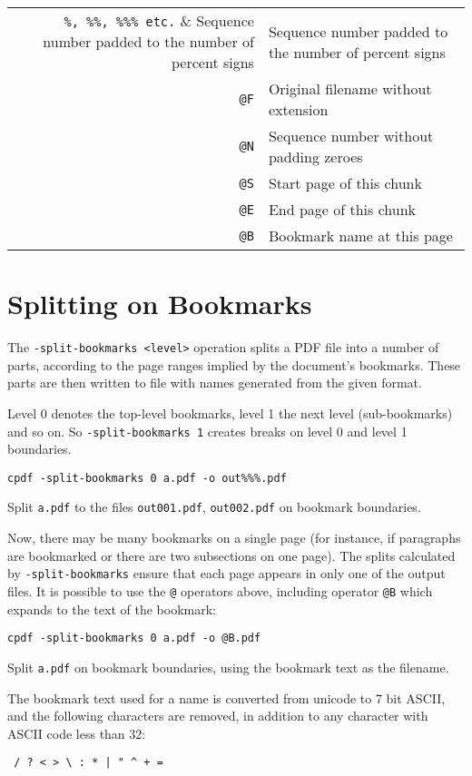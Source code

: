 \documentclass{book}
\begin{document}
\begin{table}[h]
\centering
\begin{tabular}{rl}
  \verb!%, %%, %%% etc.! & Sequence number padded to the number of percent signs\\
  \texttt{@F} & Original filename without extension \\
  \texttt{@N} & Sequence number without padding zeroes \\
  \texttt{@S} & Start page of this chunk \\
  \texttt{@E} & End page of this chunk \\
  \texttt{@B} & Bookmark name at this page \\
\end{tabular}
\end{table}

  \section{Splitting on Bookmarks}
  The \texttt{-split-bookmarks <level>} operation splits a PDF file into a number of
parts, according to the page ranges implied by the document's bookmarks. These
parts are then written to file with names generated from the given format.
  
Level 0 denotes the top-level bookmarks, level 1 the next level (sub-bookmarks)
and so on. So \texttt{-split-bookmarks 1} creates breaks on level 0 and level
1 boundaries.

  \begin{framed}\small
    \verb!cpdf -split-bookmarks 0 a.pdf -o out%%%.pdf!

    \vspace{2.5mm}
    \noindent Split \texttt{a.pdf} to the files \texttt{out001.pdf},
\texttt{out002.pdf} on bookmark boundaries.

  \end{framed}
\noindent Now, there may be many bookmarks on a single page (for instance, if
paragraphs are bookmarked or there are two subsections on one page). The splits
calculated by \texttt{-split-bookmarks} ensure that each page appears in only
one of the output files.
  It is possible to use the \texttt{@} operators above, including operator \texttt{@B} which expands to the text of the bookmark:

  \begin{framed}\small
    \verb!cpdf -split-bookmarks 0 a.pdf -o @B.pdf!

    \vspace{2.5mm}
    \noindent Split \texttt{a.pdf} on bookmark boundaries, using the bookmark text as the filename.

  \end{framed}
\noindent The bookmark text used for a name is converted from unicode to 7 bit ASCII, and the following characters are removed, in addition to any character with ASCII code less than 32:
  \begin{framed}
  \centering
  \verb! / ? < > \ : * | " ^ + =!
  \end{framed}
\end{document}
